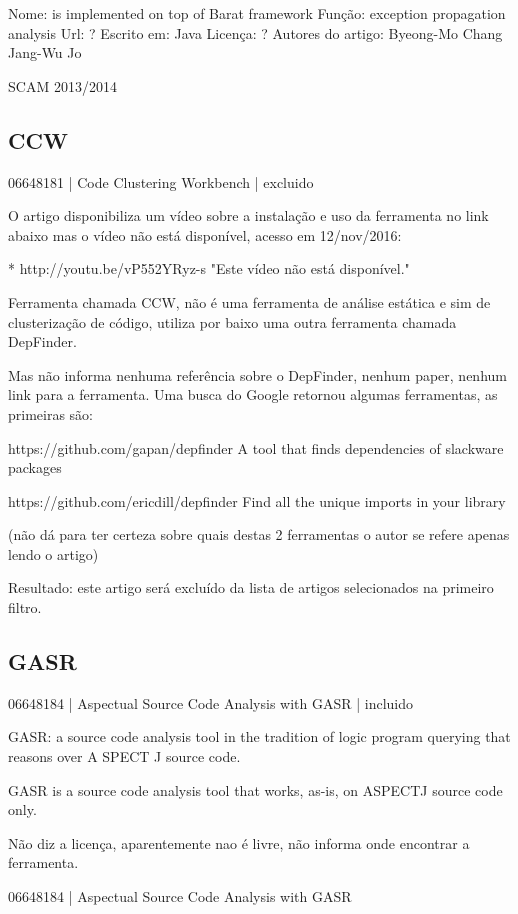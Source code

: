 Nome: is implemented on top of Barat framework
Função: exception propagation analysis 
Url: ?
Escrito em: Java 
Licença: ?
Autores do artigo: Byeong-Mo Chang
                   Jang-Wu Jo

SCAM 2013/2014

\subsection{CCW}

06648181 | Code Clustering Workbench | excluido

O artigo disponibiliza um vídeo sobre a instalação e uso da ferramenta no link
abaixo mas o vídeo não está disponível, acesso em 12/nov/2016:

* http://youtu.be/vP552YRyz-s "Este vídeo não está disponível."

Ferramenta chamada CCW, não é uma ferramenta de análise estática e sim de
clusterização de código, utiliza por baixo uma outra ferramenta chamada
DepFinder.

Mas não informa nenhuma referência sobre o DepFinder, nenhum paper, nenhum
link para a ferramenta. Uma busca do Google retornou algumas ferramentas, as
primeiras são:

https://github.com/gapan/depfinder
A tool that finds dependencies of slackware packages

https://github.com/ericdill/depfinder
Find all the unique imports in your library

(não dá para ter certeza sobre quais destas 2 ferramentas o autor se refere
apenas lendo o artigo)

Resultado: este artigo será excluído da lista de artigos selecionados na
primeiro filtro.

\subsection{GASR}

06648184 | Aspectual Source Code Analysis with GASR | incluido

GASR: a source code analysis tool in the tradition of logic program querying
that reasons over A SPECT J source code.

GASR is a source code analysis tool that works, as-is, on ASPECTJ source code only.

Não diz a licença, aparentemente nao é livre, não informa onde encontrar a
ferramenta.

06648184 | Aspectual Source Code Analysis with GASR

